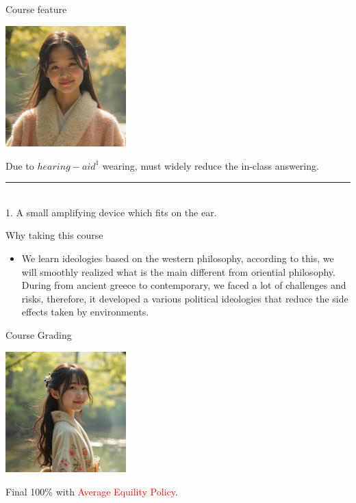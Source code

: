 \documentclass{beamer}
\begin{document}
\begin{frame}{Course feature}
\begin{center}
\includegraphics[width=0.35\textwidth]{feature.png}
\end{center}
\begin{center}
Due to $hearing-aid^{1}$ wearing, must widely reduce the in-class answering.
\end{center}
\vspace{1em}
\rule{0.35\textwidth}{0.5pt} \\
\scriptsize 1. A small amplifying device which fits on the ear.
\end{frame}
\begin{frame}{Why taking this course}
\begin{itemize}
\item We learn ideologies based on the western philosophy, according to this, we will smoothly realized what is the main different from oriential philosophy. During from ancient greece to contemporary, we faced a lot of challenges and risks, therefore, it developed a various political ideologies that reduce the side effects taken by environments.
\end{itemize}
\end{frame}
\begin{frame}{Course Grading}
\begin{center}
\includegraphics[width=0.35\textwidth]{examination.png}
\end{center}
\begin{center}
Final 100\% with \textcolor{red}{Average Equility Policy}.
\end{center}
\end{frame}
\end{document}
